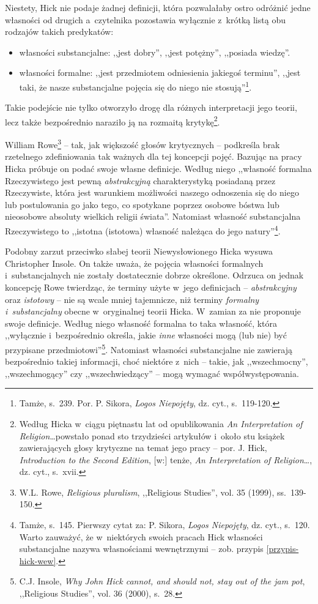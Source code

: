 Niestety, Hick nie podaje żadnej definicji, która pozwalałaby ostro odróżnić jedne własności od drugich a~czytelnika pozostawia wyłącznie z~krótką listą obu rodzajów takich predykatów:

\begin{itemize}
\item własności substancjalne: ,,jest dobry'', ,,jest potężny'', ,,posiada wiedzę''.
\item własności formalne: ,,jest przedmiotem odniesienia jakiegoś terminu'', ,,jest taki, że nasze substancjalne pojęcia się do niego nie stosują''\footnote{Tamże, s.~239. Por. P. Sikora, \textit{Logos Niepojęty}, dz. cyt., s.~119-120.}.
\end{itemize}
Takie podejście nie tylko otworzyło drogę dla różnych interpretacji jego teorii, lecz także bezpośrednio naraziło ją na rozmaitą krytykę\footnote{Według Hicka w~ciągu piętnastu lat od opublikowania \textit{An Interpretation of Religion}\ldots powstało ponad sto trzydzieści artykułów i~około stu książek zawierających głosy krytyczne na temat jego pracy -- por. J. Hick, \textit{Introduction to the Second Edition}, [w:] tenże, \textit{An Interpretation of Religion}\ldots, dz. cyt., s.~xvii.}.

William Rowe\footnote{W.L. Rowe, \textit{Religious pluralism}, ,,Religious Studies'', vol. 35 (1999), ss.~139-150.} -- tak, jak większość głosów krytycznych -- podkreśla brak rzetelnego zdefiniowania tak ważnych dla tej koncepcji pojęć. Bazując na pracy Hicka próbuje on podać swoje własne definicje. Według niego ,,własność formalna Rzeczywistego jest pewną \textit{abstrakcyjną} charakterystyką posiadaną przez Rzeczywiste, która jest warunkiem możliwości naszego odnoszenia się do niego lub postulowania go jako tego, co spotykane poprzez osobowe bóstwa lub nieosobowe absoluty wielkich religii świata''. Natomiast własność substancjalna Rzeczywistego to ,,istotna (istotowa) własność należąca do jego natury''\footnote{Tamże, s.~145. Pierwszy cytat za: P. Sikora, \textit{Logos Niepojęty}, dz. cyt., s.~120. Warto zauważyć, że w~niektórych swoich pracach Hick własności substancjalne nazywa własnościami wewnętrznymi -- zob. przypis \ref{przypis-hick-wew}.}.

Podobny zarzut przeciwko słabej teorii Niewysłowionego Hicka wysuwa Christopher Insole. On także uważa, że pojęcia własności formalnych i~substancjalnych nie zostały dostatecznie dobrze określone. Odrzuca on jednak koncepcję Rowe twierdząc, że terminy użyte w~jego definicjach -- \textit{abstrakcyjny} oraz \textit{istotowy} -- nie są wcale mniej tajemnicze, niż terminy \textit{formalny i~substancjalny} obecne w~oryginalnej teorii Hicka. W~zamian za nie proponuje swoje definicje. Według niego własność formalna to taka własność, która ,,wyłącznie i~bezpośrednio określa, jakie \textit{inne} własności mogą (lub nie) być przypisane przedmiotowi''\footnote{C.J. Insole, \textit{Why John Hick cannot, and should not, stay out of the jam pot}, ,,Religious Studies'', vol. 36 (2000), s.~28.}. Natomiast własności substancjalne nie zawierają bezpośrednio takiej informacji, choć niektóre z~nich -- takie, jak ,,wszechmocny'', ,,wszechmogący'' czy ,,wszechwiedzący'' -- mogą wymagać współwystępowania.

